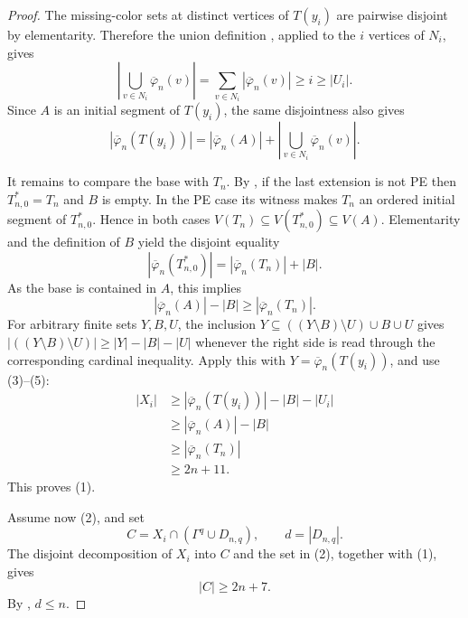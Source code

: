 \begin{proof}
The missing-color sets at distinct vertices of $T(y_i)$ are pairwise
disjoint by elementarity.  Therefore the union definition
, applied to the $i$ vertices of $N_i$, gives
\[
 \left|\bigcup_{v\in N_i}\overline\varphi_n(v)\right|
   =\sum_{v\in N_i}|\overline\varphi_n(v)|\ge i\ge |U_i|.       \tag{3}
\]
Since $A$ is an initial segment of $T(y_i)$, the same disjointness also
gives
\[
 |\overline\varphi_n(T(y_i))|
 =|\overline\varphi_n(A)|+
   \left|\bigcup_{v\in N_i}\overline\varphi_n(v)\right|.       \tag{4}
\]

It remains to compare the base with $T_n$.  By
, if the last extension is not PE then
$T_{n,0}^{*}=T_n$ and $B$ is empty.  In the PE case its
 witness makes $T_n$ an ordered initial segment
of $T_{n,0}^{*}$.  Hence in both cases
$V(T_n)\subseteq V(T_{n,0}^{*})\subseteq V(A)$.  Elementarity and the
definition of $B$ yield the disjoint equality
\[
 |\overline\varphi_n(T_{n,0}^{*})|
   =|\overline\varphi_n(T_n)|+|B|.
\]
As the base is contained in $A$, this implies
\[
                  |\overline\varphi_n(A)|-|B|
                       \ge |\overline\varphi_n(T_n)|.           \tag{5}
\]
For arbitrary finite sets $Y,B,U$, the inclusion
$Y\subseteq((Y\setminus B)\setminus U)\cup B\cup U$ gives
$|((Y\setminus B)\setminus U)|\ge |Y|-|B|-|U|$ whenever the
right side is read through the corresponding cardinal inequality.
Apply this with $Y=\overline\varphi_n(T(y_i))$, and use (3)--(5):
\[
\begin{aligned}
 |X_i|
 &\ge |\overline\varphi_n(T(y_i))|-|B|-|U_i|\\
 &\ge |\overline\varphi_n(A)|-|B|\\
 &\ge |\overline\varphi_n(T_n)|\\
 &\ge 2n+11.
\end{aligned}
\]
This proves (1).

Assume now (2), and set
\[
 C=X_i\cap(\Gamma^q\cup D_{n,q}),\qquad d=|D_{n,q}|.
\]
The disjoint decomposition of $X_i$ into $C$ and the set in (2), together
with (1), gives
\[
                              |C|\ge 2n+7.                       \tag{6}
\]
By , $d\le n$.


\end{proof}
